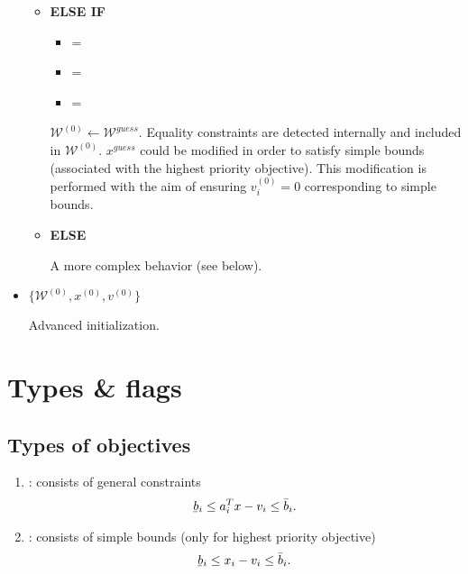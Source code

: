 \documentclass[12pt,a4paper]{article}
\newcommand{\ubar}[1]{\underaccent{\bar}{#1}}
\begin{document}
\begin{itemize}
\begin{itemize}
  \item[\ding{237}] {\bf ELSE IF}

    \begin{itemize}
    \item {\color{blue} = }
    \item {} =  
    \item {} = 
    \end{itemize}
    $\mathcal{W}^{(0)} \leftarrow \mathcal{W}^{\mathit{guess}}$. Equality constraints are detected
    internally and included in $\mathcal{W}^{(0)}$. $x^{\mathit{guess}}$ could be modified in order
    to satisfy simple bounds (associated with the highest priority objective). This modification is
    performed with the aim of ensuring $v_i^{(0)} = 0$ corresponding to simple bounds.

  \item[\ding{237}] {\bf ELSE}

    A more complex behavior (see below).

  \end{itemize}

\item {\color{blue}$\{\mathcal{W}^{(0)}, x^{(0)}, v^{(0)}\}$}

  Advanced initialization.

\end{itemize}

\clearpage

\section{Types \& flags}

\subsection{Types of objectives}

\begin{enumerate}
\item {}: consists of general constraints
%
  \begin{align} \label{eq.ctr}
    \ubar{b}_i \leq a_i^Tx -v_i \leq \bar{b}_i.
  \end{align}

\item {}: consists of simple bounds (only for highest priority objective)
%
  \begin{align} \label{eq.simple_bounds}
    \ubar{b}_i \leq x_i - v_i \leq \bar{b}_i.
  \end{align}

\end{enumerate}
\end{document}
